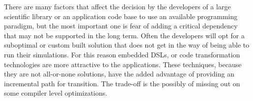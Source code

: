 
There are many factors that affect the decision by the developers of a
large scientific library or an application code base to use an 
available programming paradigm, but the most important one is fear of
adding a critical dependency that may not be supported in the long
term. Often the developers will opt for a suboptimal or custom built
solution that does not get in the way of being able to run their
simulations. For this reason embedded DSLs, or code transformation
technologies are more attractive to the applications. These
techniques, because they are not all-or-none solutions, have the added
advantage of providing an incremental path for transition. The trade-off
is the possibly of missing out on some compiler level optimizations.  

